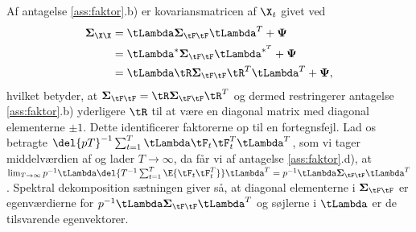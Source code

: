 Af antagelse \ref{ass:faktor}.b) er kovariansmatricen af \(\X_t\) givet ved
\begin{align*}
\boldsymbol{\Sigma}_{\X \X} &=  \tLambda  \boldsymbol{\Sigma}_{\tF\tF} \tLambda^T + \boldsymbol{\Psi} \\
&= \tLambda^* \boldsymbol{\Sigma}_{\tF\tF} \tLambda^{*^T} + \boldsymbol{\Psi} \\
&= \tLambda \tR \boldsymbol{\Sigma}_{\tF\tF} \tR^T \tLambda^T +  \boldsymbol{\Psi},
\end{align*}
hvilket betyder, at \(\boldsymbol{\Sigma}_{\tF\tF} = \tR \boldsymbol{\Sigma}_{\tF\tF} \tR^T\) og dermed restringerer antagelse \ref{ass:faktor}.b) yderligere \(\tR\) til at være en diagonal matrix med diagonal elementerne \(\pm 1\).
Dette identificerer faktorerne op til en fortegnsfejl.
%
Lad os betragte \(\del{pT}^{-1} \sum_{t=1}^T \tLambda \tF_t \tF_t^T \tLambda^T\), som vi tager middelværdien af og lader \(T \rightarrow \infty\), da får vi af antagelse \ref{ass:faktor}.d), at
\(\lim_{T \rightarrow \infty} p^{-1} \tLambda \del{T^{-1} \sum_{t=1}^T \E{\tF_t \tF_t^T}} \tLambda^T = p^{-1} \tLambda \boldsymbol{\Sigma}_{\tF\tF} \tLambda^T\).
Spektral dekomposition sætningen giver så, at diagonal elementerne i \(\boldsymbol{\Sigma}_{\tF\tF}\) er egenværdierne for \(p^{-1} \tLambda \boldsymbol{\Sigma}_{\tF\tF} \tLambda^T\) og søjlerne i \(\tLambda\) er de tilsvarende egenvektorer.
%

